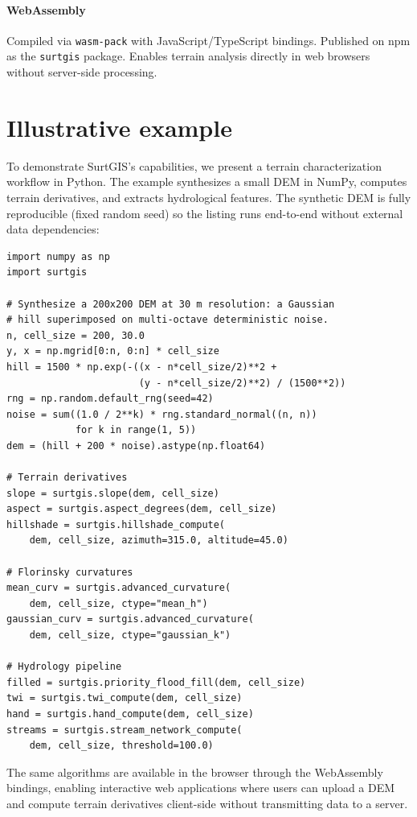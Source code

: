 \documentclass[preprint,review,12pt,authoryear]{elsarticle}
\begin{document}
\paragraph{WebAssembly} Compiled via \texttt{wasm-pack} with JavaScript/TypeScript bindings. Published on npm as the \texttt{surtgis} package. Enables terrain analysis directly in web browsers without server-side processing.

\section{Illustrative example}
\label{sec:example}

To demonstrate SurtGIS's capabilities, we present a terrain characterization workflow in Python. The example synthesizes a small DEM in NumPy, computes terrain derivatives, and extracts hydrological features. The synthetic DEM is fully reproducible (fixed random seed) so the listing runs end-to-end without external data dependencies:

\begin{verbatim}
import numpy as np
import surtgis

# Synthesize a 200x200 DEM at 30 m resolution: a Gaussian
# hill superimposed on multi-octave deterministic noise.
n, cell_size = 200, 30.0
y, x = np.mgrid[0:n, 0:n] * cell_size
hill = 1500 * np.exp(-((x - n*cell_size/2)**2 +
                       (y - n*cell_size/2)**2) / (1500**2))
rng = np.random.default_rng(seed=42)
noise = sum((1.0 / 2**k) * rng.standard_normal((n, n))
            for k in range(1, 5))
dem = (hill + 200 * noise).astype(np.float64)

# Terrain derivatives
slope = surtgis.slope(dem, cell_size)
aspect = surtgis.aspect_degrees(dem, cell_size)
hillshade = surtgis.hillshade_compute(
    dem, cell_size, azimuth=315.0, altitude=45.0)

# Florinsky curvatures
mean_curv = surtgis.advanced_curvature(
    dem, cell_size, ctype="mean_h")
gaussian_curv = surtgis.advanced_curvature(
    dem, cell_size, ctype="gaussian_k")

# Hydrology pipeline
filled = surtgis.priority_flood_fill(dem, cell_size)
twi = surtgis.twi_compute(dem, cell_size)
hand = surtgis.hand_compute(dem, cell_size)
streams = surtgis.stream_network_compute(
    dem, cell_size, threshold=100.0)
\end{verbatim}

The same algorithms are available in the browser through the WebAssembly bindings, enabling interactive web applications where users can upload a DEM and compute terrain derivatives client-side without transmitting data to a server.
\end{document}
